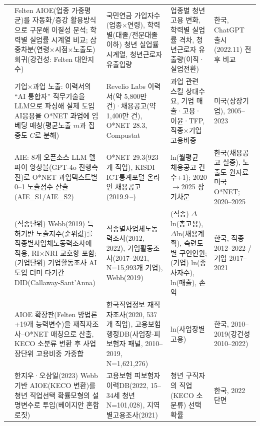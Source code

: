 \documentclass[11pt]{article}
\begin{document}
\begin{longtable}{L{2.3cm}L{4.1cm}L{3.6cm}L{2.6cm}L{2.3cm}}
\citet{bok-2026-youth-employment-decline-ai-career-ladder} &
Felten AIOE(업종 가중평균)를 자동화/증강 활용방식으로 구분해 이질성 분석; 학력별 실업률 시계열 비교; 삼중차분(연령$\times$시점$\times$노출도) 회귀(강건성: Felten 대안지수) &
국민연금 가입자수(업종$\times$연령), 학력별(대졸/전문대졸이하) 청년 실업률 시계열, 청년근로자 유출입량 &
업종별 청년고용 변화, 학력별 실업률 격차, 청년근로자 유출량(이직·실업전환) &
한국, ChatGPT 출시(2022.11) 전후 비교\\

\citet{hampole-2025-artificial-intelligence-and-the-labor} &
기업$\times$과업 노출: 이력서의 ``AI 통합자'' 직무기술을 LLM으로 파싱해 실제 도입 AI응용을 O*NET 과업에 임베딩 매칭(평균노출 $m$과 집중도 $C$로 분해) &
Revelio Labs 이력서(약 5,800만 건)·채용공고(약 1,400만 건), O*NET 28.3, Compustat &
과업 관련 스킬 상대수요, 기업 매출·고용·이윤·TFP, 직종$\times$기업 고용비중 &
미국(상장기업), 2005--2023\\

\citet{keis-2025-ai-job-exposure-labor-demand} &
AIE: 8개 오픈소스 LLM 델파이 앙상블(GPT-4o 진행촉진)로 O*NET 과업텍스트별 0--1 노출점수 산출(AIE\_S1/AIE\_S2) &
O*NET 29.3(923개 직업), KISDI ICT통계포털 온라인 채용공고(2019.9\,--) &
ln(월평균 채용공고 건수+1); 2020$\to$2025 장기차분 &
한국(채용공고 실증), 노출도 원자료 미국 O*NET; 2020--2025\\

\citet{kiet-2024-ai-labor-market-industry} &
(직종단위) Webb(2019) 특허기반 노출지수(순위값)를 직종별사업체노동력조사에 적용, RI$\times$NRI 교호항 포함; (기업단위) 기업활동조사 AI 도입 더미 다기간 DID(Callaway-Sant'Anna) &
직종별사업체노동력조사(2012, 2022), 기업활동조사(2017--2021, N=15,993개 기업), Webb(2019) &
(직종) $\Delta$ln(총고용), $\Delta$ln(채용계획), 숙련도별 구인인원; (기업) ln(종사자수), ln(매출), 손익 &
한국, 직종 2012--2022 / 기업 2017--2021\\

\citet{kiet-2025-ai-occupational-employment-effect} &
AIOE 확장판(Felten 방법론+19개 능력변수)을 재직자조사--O*NET 매칭으로 산출, KECO 소분류 변환 후 사업장단위 고용비중 가중합 &
한국직업정보 재직자조사(2020, 537개 직업), 고용보험 행정DB(사업장-피보험자 패널, 2010--2019, N=1,621,276) &
ln(사업장별 고용) &
한국, 2010--2019(강건성 2010--2022)\\

\citet{kim-2025-youth-job-choice-ai-exposure} &
한지우·오삼일(2023) Webb 기반 AIOE(KECO 변환)를 청년 직업선택 확률모형의 설명변수로 투입(베이지안 혼합로짓) &
고용보험 피보험자 이력DB(2022, 15--34세 청년 N=101,028), 지역별고용조사(2021) &
청년 구직자의 직업(KECO 소분류) 선택 확률 &
한국, 2022 단면\\


\end{longtable}
\end{document}
